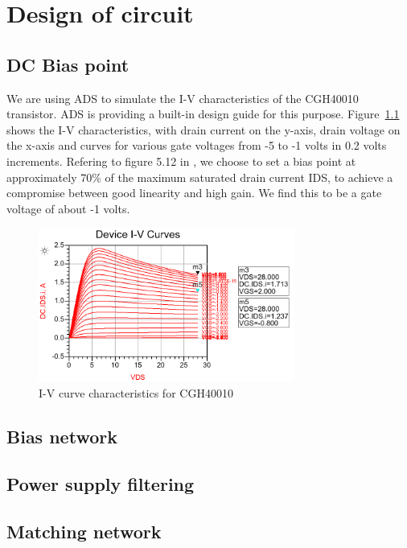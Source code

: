 \chapter{Design of circuit}
  
  \section{DC Bias point}

  We are using ADS to simulate the I-V characteristics of the CGH40010 transistor. ADS is providing a built-in design guide for this purpose. Figure~\ref{fig:fig_IV} shows the I-V characteristics, with drain current on the y-axis, drain voltage on the x-axis and curves for various gate voltages from -5 to -1 volts in 0.2 volts increments. Refering to figure 5.12 in \cite[p.~200]{AmpRobertson}, we choose to set a bias point at approximately 70\% of the maximum saturated drain current IDS, to achieve a compromise between good linearity and high gain. We find this to be a gate voltage of about -1 volts.

  \begin{figure}[h]
	  \label{fig:fig_IV}
	  \centering
	  \includegraphics[width=0.75\textwidth]{img/01_IVCurve.png}
	  \caption{I-V curve characteristics for CGH40010}
  \end{figure}

  \section{Bias network}

  \section{Power supply filtering}

  \section{Matching network}
